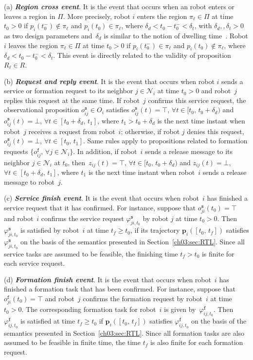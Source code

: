 (a) \textbf{\emph{Region cross event}}. It is the event that occurs when an robot enters or leaves a region in $\Pi$. More precisely, robot $i$ {enters} the region $\pi_{\ell}\in \Pi$ at time $t_0>0$ if $p_i(t_0^-) \notin \pi_{\ell}$ and $p_i(t_0)\in \pi_{\ell}$, where $\delta_{d}<t_0-t_0^-<\delta_t$, with $\delta_d,
,\delta_t>0$ as two design parameters and~$\delta_d$ is similar to the notion of dwelling time~\cite{franceschelli2008motion}.
Robot $i$ {leaves} the region $\pi_{\ell}\in \Pi$ at time $t_0>0$ if $p_i(t^-_0)\in \pi_{\ell}$ and $p_i(t_0) \notin \pi_{\ell}$, where $\delta_d<t_0-t_0^-<\delta_t$.
This event is directly related to the validity of proposition $R_{\ell}\in R$.


(b) \textbf{\emph{Request and reply event}}. It is the event that occurs when robot $i$ sends a service or formation request to its neighbor $j\in \mathcal{N}_i$ at time $t_0>0$ and robot~$j$ replies this request at the same time.
If robot~$j$ confirms this service request, the observational proposition $o^\texttt{s}_{ij}\in O_i$ satisfies $o^\texttt{s}_{ij}(t)=\top$, $\forall t\in [t_0,\,t_0+\delta_d)$ and $o^\texttt{s}_{ij}(t)=\bot$, $\forall t\in [t_0+\delta_d,\,t_1]$, where $t_1>t_0+\delta_d$ is the next time instant when robot~$j$ receives a request from robot~$i$; otherwise, if robot $j$ {denies} this request, $o^\texttt{s}_{ij}(t)=\bot$, $\forall t\in [t_0,\,t_1]$. Same rules apply to propositions related to formation requests $\{o^\texttt{f}_{ij},\,\forall j\in \mathcal{N}_i\}$.
In addition, if robot~$i$ sends a release message to its neighbor $j\in \mathcal{N}_i$ at $t_0$, then~$z_{ij}(t)=\top$, $\forall t\in [t_0,\,t_0+\delta_d)$ and $z_{ij}(t)=\bot$, $\forall t\in [t_0+\delta_d,\,t_1]$, where $t_1$ is the next time instant when robot~$i$ sends a release message to robot~$j$.

(c) \textbf{\emph{Service finish event}}.
It is the event that  occurs when robot~$i$ has finished a service request that it has confirmed.
For instance, suppose that $o^\texttt{s}_{ji}(t_0)=\top$ and robot~$i$ confirms the service request $\varphi_{ji,t_0}^{\texttt{s}}$ by robot $j$ at time $t_0>0$.
Then $\varphi_{ji,t_0}^{\texttt{s}}$ is {satisfied} by robot~$i$ at time $t_f\geq t_0$, if its trajectory $\mathbf{p}_i([t_0,\, t_f])$ satisfies $\varphi_{ji,t_0}^{\texttt{s}}$ on the basis of the semantics presented in Section~\ref{ch03:sec:RTL}. Since all service tasks are assumed to be feasible,  the finishing time $t_f>t_0$ is finite for each service request.

(d) \textbf{\emph{Formation finish event}}. It is the event that occurs when robot~$i$ has finished a formation task that has been confirmed.
For instance, suppose that $o^\texttt{f}_{ji}(t_0)=\top$ and robot~$j$ confirms the formation request by robot~$i$ at time $t_0>0$.
The corresponding formation task for robot~$i$ is given by~$\varphi_{ij,t_0}^{\texttt{f}}$.
Then~$\varphi_{ij,t_0}^{\texttt{f}}$ is {satisfied} at time $t_f\geq t_0$ if $\mathbf{p}_i([t_0,\, t_f])$ satisfies $\varphi_{ij,t_0}^{\texttt{f}}$ on the basis of the semantics presented in Section~\ref{ch03:sec:RTL}. Since all formation tasks are also assumed to be feasible in finite time, the time $t_f$ is also finite for each formation request.

